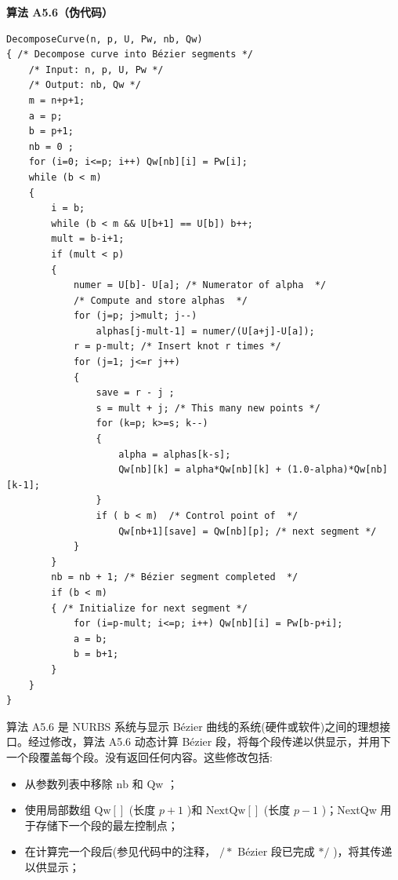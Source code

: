 \documentclass[../main.tex]{subfiles}
\begin{document}
\par\medskip\noindent\textbf{算法 A5.6（伪代码）}\par
\begin{verbatim}
DecomposeCurve(n, p, U, Pw, nb, Qw)
{ /* Decompose curve into Bézier segments */
    /* Input: n, p, U, Pw */
    /* Output: nb, Qw */
    m = n+p+1;
    a = p;
    b = p+1;
    nb = 0 ;
    for (i=0; i<=p; i++) Qw[nb][i] = Pw[i];
    while (b < m)
    {
        i = b;
        while (b < m && U[b+1] == U[b]) b++;
        mult = b-i+1;
        if (mult < p)
        {
            numer = U[b]- U[a]; /* Numerator of alpha  */
            /* Compute and store alphas  */
            for (j=p; j>mult; j--)
                alphas[j-mult-1] = numer/(U[a+j]-U[a]);
            r = p-mult; /* Insert knot r times */
            for (j=1; j<=r j++)
            {
                save = r - j ;
                s = mult + j; /* This many new points */
                for (k=p; k>=s; k--)
                {
                    alpha = alphas[k-s];
                    Qw[nb][k] = alpha*Qw[nb][k] + (1.0-alpha)*Qw[nb][k-1];
                }
                if ( b < m)  /* Control point of  */
                    Qw[nb+1][save] = Qw[nb][p]; /* next segment */
            }
        }
        nb = nb + 1; /* Bézier segment completed  */
        if (b < m)
        { /* Initialize for next segment */
            for (i=p-mult; i<=p; i++) Qw[nb][i] = Pw[b-p+i];
            a = b;
            b = b+1;
        }
    }
}
\end{verbatim}

算法 A5.6 是 NURBS 系统与显示 Bézier 曲线的系统(硬件或软件)之间的理想接口。经过修改，算法 A5.6 动态计算 Bézier 段，将每个段传递以供显示，并用下一个段覆盖每个段。没有返回任何内容。这些修改包括:

\begin{itemize}
\item 从参数列表中移除 \(\mathrm{{nb}}\) 和 \(\mathrm{{Qw}}\) ；
\end{itemize}

\begin{itemize}
\item 使用局部数组 \(\mathrm{{Qw}}\left\lbrack  \right\rbrack\) (长度 \(p + 1\) )和 \(\mathrm{{NextQw}}\left\lbrack  \right\rbrack\) (长度 \(p - 1\) )；NextQw 用于存储下一个段的最左控制点；
\end{itemize}

\begin{itemize}
\item 在计算完一个段后(参见代码中的注释， \(/ *\) Bézier 段已完成 \(* /\) )，将其传递以供显示；
\end{itemize}
\end{document}
